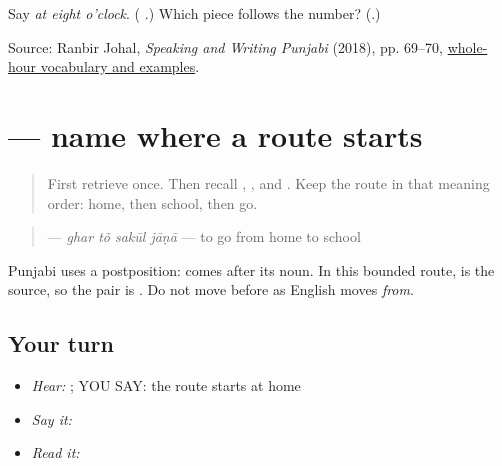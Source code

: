 \begin{tcolorbox}[breakable,colback=teal!4,colframe=teal!35!black,title={Before you move on}]
Say \emph{at eight o'clock}. (\textbf{ }.) Which piece follows the number? (\textbf{}.)

Source: Ranbir Johal, \emph{Speaking and Writing Punjabi} (2018), pp. 69–70, \href{https://openlibrary-repo.ecampusontario.ca/jspui/bitstream/123456789/492/2/2018Pun1100CoursePackage.pdf}{whole-hour vocabulary and examples}.
\end{tcolorbox}
\section[\texorpdfstring{\pa{ਘਰ} \pa{ਤੋਂ} \pa{ਸਕੂਲ} \pa{ਜਾਣਾ} (ghar ton sakul jana)}{ਘਰ ਤੋਂ ਸਕੂਲ ਜਾਣਾ (ghar ton sakul jana)}]{    — name where a route starts}

\label{lesson:PA-C178-ton}



\begin{quote}
First retrieve \textbf{    } once. Then recall \textbf{}, \textbf{}, and \textbf{}. Keep the route in that meaning order: home, then school, then go.
\end{quote}

\begin{grammarlens}[title={Grammar Lens: \pa{ਤੋਂ} follows the source}]
\begin{quote}
\textbf{   } — \emph{ghar tõ sakūl jāṇā} — to go from home to school
\end{quote}

Punjabi uses a postposition: \textbf{} comes after its noun. In this bounded route, \textbf{} is the source, so the pair is \textbf{ }. Do not move \textbf{} before \textbf{} as English moves \emph{from}.
\end{grammarlens}

\subsection*{Your turn}
\begin{itemize}
\raggedright
  \item \emph{Hear:} \textbf{ }; YOU SAY: the route starts at home
  \item \emph{Say it:} \textbf{   }
  \item \emph{Read it:} \textbf{   }
\end{itemize}

